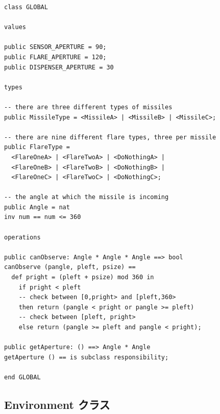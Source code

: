 \documentclass[\pformat,12pt]{jreport}
\begin{document}
\begin{lstlisting}
class GLOBAL

values

public SENSOR_APERTURE = 90;
public FLARE_APERTURE = 120;
public DISPENSER_APERTURE = 30

types

-- there are three different types of missiles
public MissileType = <MissileA> | <MissileB> | <MissileC>;

-- there are nine different flare types, three per missile
public FlareType =
  <FlareOneA> | <FlareTwoA> | <DoNothingA> | 
  <FlareOneB> | <FlareTwoB> | <DoNothingB> | 
  <FlareOneC> | <FlareTwoC> | <DoNothingC>;

-- the angle at which the missile is incoming
public Angle = nat
inv num == num <= 360

operations

public canObserve: Angle * Angle * Angle ==> bool
canObserve (pangle, pleft, psize) ==
  def pright = (pleft + psize) mod 360 in
    if pright < pleft
    -- check between [0,pright> and [pleft,360>
    then return (pangle < pright or pangle >= pleft)
    -- check between [pleft, pright>
    else return (pangle >= pleft and pangle < pright);
       
public getAperture: () ==> Angle * Angle
getAperture () == is subclass responsibility;

end GLOBAL
\end{lstlisting}

\subsection{Environment クラス}
\end{document}
